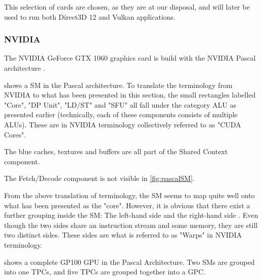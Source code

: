 This selection of cards are chosen, as they are at our disposal, and will later be used to run both Direct3D 12 and Vulkan applications.

\subsubsection{NVIDIA}
The NVIDIA GeForce GTX 1060 graphics card is build with the NVIDIA Pascal architecture \cite{nvidia_gtx_1060}.


 shows a \gls{SM} in the Pascal architecture.
To translate the terminology from NVIDIA to what has been presented in this section, the small rectangles labelled "Core", "DP Unit", "LD/ST" and "SFU" all fall under the category \gls{ALU} as presented earlier (technically, each of these components consists of multiple \glspl{ALU}).
These are in NVIDIA terminology collectively referred to as "CUDA Cores".

The blue caches, textures and buffers are all part of the Shared Context component.

The Fetch/Decode component is not visible in \cref{fig:pascalSM}.

From the above translation of terminology, the \gls{SM} seems to map quite well onto what has been presented as the "core".
However, it is obvious that there exist a further grouping inside the \gls{SM}: The left-hand side and the right-hand side .
Even though the two sides share an instruction stream and some memory, they are still two distinct sides.
These sides are what is referred to as "Warps" in NVIDIA terminology.



 shows a complete GP100 GPU in the Pascal Architecture.
Two \glspl{SM} are grouped into one \glspl{TPC}, and five \glspl{TPC} are grouped together into a \gls{GPC}. \\

